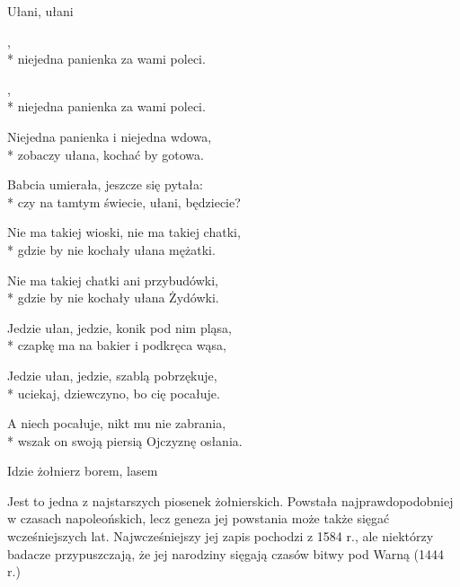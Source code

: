 \song
{Ułani, ułani}

\begin{lyrics}[longestline={Nie ma takiej wioski, nie ma takiej chatki,}]

,\\*
niejedna panienka za wami poleci.

\begin{chorus}
,\\*
niejedna panienka za wami poleci.
\end{chorus}

Niejedna panienka i niejedna wdowa,\\*
zobaczy ułana, kochać by gotowa.

\chorusref

Babcia umierała, jeszcze się pytała:\\*
czy na tamtym świecie, ułani, będziecie?

\chorusref

Nie ma takiej wioski, nie ma takiej chatki,\\*
gdzie by nie kochały ułana mężatki.

\chorusref

Nie ma takiej chatki ani przybudówki,\\*
gdzie by nie kochały ułana Żydówki.

\chorusref

Jedzie ułan, jedzie, konik pod nim pląsa,\\*
czapkę ma na bakier i podkręca wąsa,

\chorusref

Jedzie ułan, jedzie, szablą pobrzękuje,\\*
uciekaj, dziewczyno, bo cię pocałuje.

\chorusref

A niech pocałuje, nikt mu nie zabrania,\\*
wszak on swoją piersią Ojczyznę osłania.

\chorusref
\end{lyrics}



\song
{Idzie żołnierz borem, lasem}
\begin{info}Jest to jedna z najstarszych piosenek żołnierskich. Powstała najprawdopodobniej w czasach napoleońskich, lecz geneza jej powstania może także sięgać wcześniejszych lat. Najwcześniejszy jej zapis pochodzi z 1584 r., ale niektórzy badacze przypuszczają, że jej narodziny sięgają czasów bitwy pod Warną (1444 r.)\end{info}

